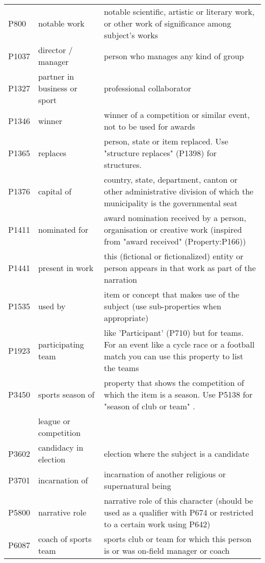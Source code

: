 \documentclass[11pt]{article}
\newcommand{\dataname}{HyperRED}
\begin{document}
\begin{table*}[!t]
{\begin{tabular}{lll}
P800 & notable work & notable scientific, artistic or literary work, or other work of significance among subject's works \\
P1037 & director / manager & person who manages any kind of group \\
P1327 & partner in business or sport & professional collaborator \\
P1346 & winner & winner of a competition or similar event, not to be used for awards \\
P1365 & replaces & person, state or item replaced. Use "structure replaces" (P1398) for structures. \\
P1376 & capital of & country, state, department, canton or other administrative division of which the municipality is the governmental seat \\
P1411 & nominated for & award nomination received by a person, organisation or creative work (inspired from "award received" (Property:P166)) \\
    P1441 & present in work & this (fictional or fictionalized) entity or person appears in that work as part of the narration \\
P1535 & used by & item or concept that makes use of the subject (use sub-properties when appropriate) \\
P1923 & participating team & like 'Participant' (P710) but for teams. For an event like a cycle race or a football match you can use this property to list the teams \\
P3450 & sports season of  & property that shows the competition of which the item is a season. Use P5138 for "season of club or team"
. \\
& league or competition & \\
P3602 & candidacy in election & election where the subject is a candidate \\
P3701 & incarnation of & incarnation of another religious or supernatural being \\
P5800 & narrative role & narrative role of this character (should be used as a qualifier with P674 or restricted to a certain work using P642) \\
P6087 & coach of sports team & sports club or team for which this person is or was on-field manager or coach \\

    \bottomrule
    \end{tabular}
    }
   \caption{List of relation labels in \dataname{}.} 
    \label{tab:relations}
\end{table*}
\end{document}
